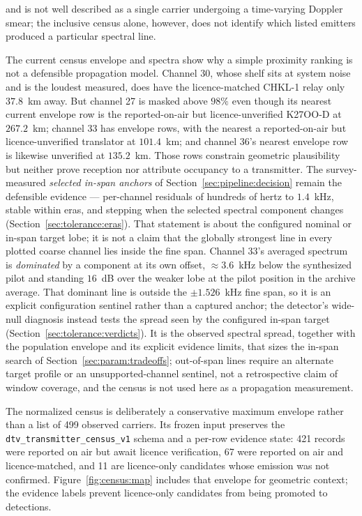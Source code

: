 and is not well described as a single carrier undergoing a time-varying Doppler smear; the inclusive census alone, however, does not identify which listed emitters produced a particular spectral line.

The current census envelope and spectra show why a simple proximity ranking is not a defensible propagation model. Channel 30, whose shelf sits at system noise and is the loudest measured, does have the licence-matched CHKL-1 relay only $37.8$~km away. But channel 27 is masked above $98\%$ even though its nearest current envelope row is the reported-on-air but licence-unverified K27OO-D at $267.2$~km; channel 33 has  envelope rows, with the nearest a reported-on-air but licence-unverified translator at $101.4$~km; and channel 36's nearest envelope row is likewise unverified at $135.2$~km. Those rows constrain geometric plausibility but neither prove reception nor attribute occupancy to a transmitter. The survey-measured \emph{selected in-span anchors} of Section~\ref{sec:pipeline:decision} remain the defensible evidence --- per-channel residuals of hundreds of hertz to $1.4$~kHz, stable within eras, and stepping when the selected spectral component changes (Section~\ref{sec:tolerance:eras}). That statement is about the configured nominal or in-span target lobe; it is not a claim that the globally strongest line in every plotted coarse channel lies inside the fine span. Channel 33's averaged spectrum is \emph{dominated} by a component at its own offset, ${\approx}3.6$~kHz below the synthesized pilot and standing $16$~dB over the weaker lobe at the pilot position in the archive average. That dominant line is outside the $\pm1.526$~kHz fine span, so it is an explicit configuration sentinel rather than a captured anchor; the detector's wide-null diagnosis instead tests the spread seen by the configured in-span target (Section~\ref{sec:tolerance:verdicts}). It is the observed spectral spread, together with the population envelope and its explicit evidence limits, that sizes the in-span search of Section~\ref{sec:param:tradeoffs}; out-of-span lines require an alternate target profile or an unsupported-channel sentinel, not a retrospective claim of window coverage, and the census is not used here as a propagation measurement.

The normalized census is deliberately a conservative maximum envelope rather
than a list of 499 observed carriers.  Its frozen input preserves the
\texttt{dtv\_transmitter\_census\_v1} schema and a per-row evidence state: 421
records were reported on air but await licence verification, 67 were reported
on air and licence-matched, and 11 are licence-only candidates whose emission
was not confirmed.  Figure~\ref{fig:census:map} includes that envelope for
geometric context; the evidence labels prevent licence-only candidates from
being promoted to detections.

